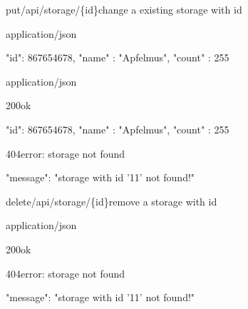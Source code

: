 \documentclass[12pt,a4paper]{article}
\begin{document}
\begin{apiRoute}{put}{/api/storage/\{id\}}{change a existing storage with id}
	\begin{routeParameter}
	\end{routeParameter}
	
	\begin{routeRequest}{application/json}
		\begin{routeRequestBody}
{
	"id": 867654678,
	"name" : "Apfelmus",
	"count" : 255
}
		\end{routeRequestBody}
	\end{routeRequest}
	\begin{routeResponse}{application/json}
		\begin{routeResponseItem}{200}{ok}
			\begin{routeResponseItemBody}
{
	"id": 867654678,
	"name" : "Apfelmus",
	"count" : 255
}
			\end{routeResponseItemBody}
		\end{routeResponseItem}
		\begin{routeResponseItem}{404}{error: storage not found}
			\begin{routeResponseItemBody}
{
	"message": "storage with id '11' not found!"
}
			\end{routeResponseItemBody}
		\end{routeResponseItem}
	\end{routeResponse}
\end{apiRoute}



\begin{apiRoute}{delete}{/api/storage/\{id\}}{remove a storage with id}
	\begin{routeParameter}
		\routeParamItem{id}{id of storage}
	\end{routeParameter}
	\begin{routeResponse}{application/json}
		\begin{routeResponseItem}{200}{ok}
			
		\end{routeResponseItem}
		\begin{routeResponseItem}{404}{error: storage not found}
			\begin{routeResponseItemBody}
{
	"message": "storage with id '11' not found!"
}
			\end{routeResponseItemBody}
		\end{routeResponseItem}
	\end{routeResponse}
\end{apiRoute}
\end{document}
